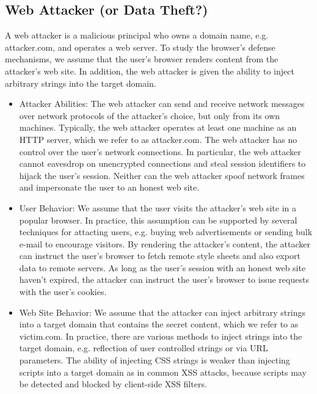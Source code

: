 \documentclass{acm_proc_article-sp}
\begin{document}
\subsection*{Web Attacker (or Data Theft?)}
A web attacker is a malicious principal who owns a domain name, e.g. attacker.com, and operates a web server. To study the browser's defense mechanisms, we assume that the user's browser renders content from the attacker's web site. In addition, the web attacker is given the ability to inject arbitrary strings into the target domain.

\begin{itemize}

\item{Attacker Abilities:}
The web attacker can send and receive network messages over network protocols of the attacker's choice, but only from its own machines. Typically, the web attacker operates at least one machine as an HTTP server, which we refer to as attacker.com. The web attacker has no control over the user's network connections. In particular, the web attacker cannot eavesdrop on unencrypted connections and steal session identifiers to hijack the user's session. Neither can the web attacker spoof network frames and impersonate the user to an honest web site.

\item{User Behavior:}
We assume that the user visits the attacker's web site in a popular browser. In practice, this assumption can be supported by several techniques for attacting users, e.g. buying web advertisements or sending bulk e-mail to encourage visitors. By rendering the attacker's content, the attacker can instruct the user's browser to fetch remote style sheets and also export data to remote servers. As long as the user's session with an honest web site haven't expired, the attacker can instruct the user's browser to issue requests with the user's cookies.

\item{Web Site Behavior:}
We assume that the attacker can inject arbitrary strings into a target domain that contains the secret content, which we refer to as victim.com. In practice, there are various methods to inject strings into the target domain, e.g. reflection of user controlled strings or via URL parameters. The ability of injecting CSS strings is weaker than injecting scripts into a target domain as in common XSS attacks, because scripts may be detected and blocked by client-side XSS filters.

\end{itemize}
\end{document}
